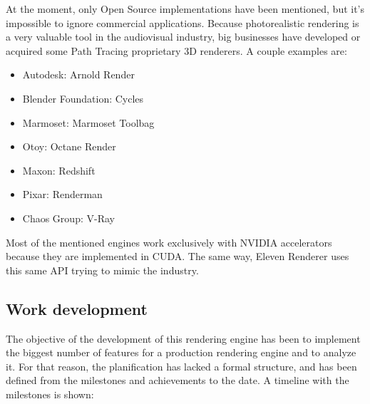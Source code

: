 At the moment, only Open Source implementations have been mentioned, but it's impossible to ignore commercial applications. Because photorealistic rendering is a very valuable tool in the audiovisual industry, big businesses have developed or acquired some Path Tracing proprietary 3D renderers. A couple examples are:

\begin{itemize}

	\item Autodesk: Arnold Render
	\item Blender Foundation: Cycles
	\item Marmoset: Marmoset Toolbag
	\item Otoy: Octane Render
	\item Maxon: Redshift
	\item Pixar: Renderman
	\item Chaos Group: V-Ray

\end{itemize}

Most of the mentioned engines work exclusively with NVIDIA accelerators because they are implemented in CUDA. The same way, Eleven Renderer uses this same API trying to mimic the industry.

\subsection{Work development}
	
The objective of the development of this rendering engine has been to implement the biggest number of features for a production rendering engine and to analyze it. For that reason, the planification has lacked a formal structure, and has been defined from the milestones and achievements to the date. A timeline with the milestones is shown:
	
